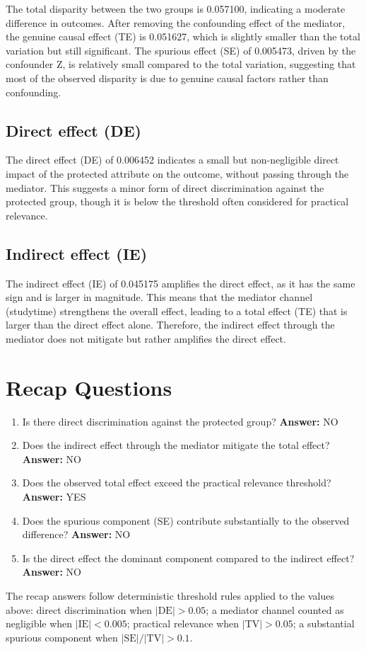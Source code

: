 \documentclass[11pt]{article}
\begin{document}
The total disparity between the two groups is 0.057100, indicating a moderate difference in outcomes. After removing the confounding effect of the mediator, the genuine causal effect (TE) is 0.051627, which is slightly smaller than the total variation but still significant. The spurious effect (SE) of 0.005473, driven by the confounder Z, is relatively small compared to the total variation, suggesting that most of the observed disparity is due to genuine causal factors rather than confounding.

\subsection{Direct effect (DE)}

The direct effect (DE) of 0.006452 indicates a small but non-negligible direct impact of the protected attribute on the outcome, without passing through the mediator. This suggests a minor form of direct discrimination against the protected group, though it is below the threshold often considered for practical relevance.

\subsection{Indirect effect (IE)}

The indirect effect (IE) of 0.045175 amplifies the direct effect, as it has the same sign and is larger in magnitude. This means that the mediator channel (studytime) strengthens the overall effect, leading to a total effect (TE) that is larger than the direct effect alone. Therefore, the indirect effect through the mediator does not mitigate but rather amplifies the direct effect.

\section{Recap Questions}

\begin{enumerate}
\item Is there direct discrimination against the protected group? \textbf{Answer:} NO
\item Does the indirect effect through the mediator mitigate the total effect? \textbf{Answer:} NO
\item Does the observed total effect exceed the practical relevance threshold? \textbf{Answer:} YES
\item Does the spurious component (SE) contribute substantially to the observed difference? \textbf{Answer:} NO
\item Is the direct effect the dominant component compared to the indirect effect? \textbf{Answer:} NO
\end{enumerate}

\vspace{1em}
\noindent\footnotesize
The recap answers follow deterministic threshold rules applied to the values above: direct discrimination when $|\mathrm{DE}| > 0.05$; a mediator channel counted as negligible when $|\mathrm{IE}| < 0.005$; practical relevance when $|\mathrm{TV}| > 0.05$; a substantial spurious component when $|\mathrm{SE}| / |\mathrm{TV}| > 0.1$.
\end{document}
